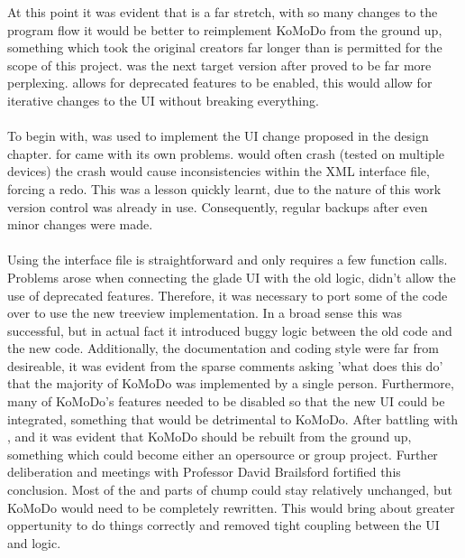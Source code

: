     At this point it was evident that  is a far stretch, with so many changes to the program flow it would be better to reimplement KoMoDo from the ground up, something which took the original creators far longer than is permitted for the scope of this project.
     was the next target version after  proved to be far more perplexing.  allows for deprecated features to be enabled, this would allow for iterative changes to the UI without breaking everything.\\\\
    To begin with,  was used to implement the UI change proposed in the design chapter.  for  came with its own problems.  would often crash (tested on multiple devices) the crash would cause inconsistencies within the XML interface file, forcing a redo. This was a lesson quickly learnt, due to the nature of this work version control was already in use. Consequently, regular backups after even minor changes were made.\\\\
    Using the  interface file is straightforward and only requires a few  function calls. Problems arose when connecting the glade UI with the old logic,  didn't allow the use of deprecated features. Therefore, it was necessary to port some of the code over to use the new treeview implementation. In a broad sense this was successful, but in actual fact it introduced buggy logic between the old  code and the new  code. Additionally, the documentation and coding style were far from desireable, it was evident from the sparse comments asking 'what does this do' that the majority of KoMoDo was implemented by a single person. Furthermore, many of KoMoDo's features needed to be disabled so that the new UI could be integrated, something that would be detrimental to KoMoDo.
    After battling with ,  and  it was evident that KoMoDo should be rebuilt from the ground up, something which could become either an opersource or group project. Further deliberation and meetings with Professor David Brailsford fortified this conclusion. Most of the  and parts of chump could stay relatively unchanged, but KoMoDo would need to be completely rewritten. This would bring about greater oppertunity to do things correctly and removed tight coupling between the UI and logic.\\\\
